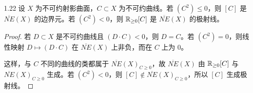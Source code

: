 
\begin{lemmap}{1.22}
设 $X$ 为不可约射影曲面，$C\subset X$ 为不可约曲线。若 $(C^2)\le0$，则 $[C]$ 是 $\overline{NE}(X)$ 的边界元。若 $(C^2)<0$，则 $\mathbb{R}_{\ge0}[C]$ 是 $\overline{NE}(X)$ 的极射线。
\end{lemmap}

\begin{proof}
若 $D\subset X$ 是不可约曲线且 $(D\cdot C)<0$，则 $D=C$。若 $(C^2)=0$，则线性映射 $D\mapsto(D\cdot C)$ 在 $\overline{NE}(X)$ 上非负，而在 $C$ 上为 $0$。

这样，与 $C$ 不同的曲线的类都属于 $\overline{NE}(X)_{C\ge0}$，故 $\overline{NE}(X)$ 由 $\mathbb{R}_{\ge0}[C]$ 与 $\overline{NE}(X)_{C\ge0}$ 生成。若 $(C^2)<0$，则 $[C]\notin\overline{NE}(X)_{C\ge0}$，所以 $[C]$ 生成极射线。
\end{proof}

